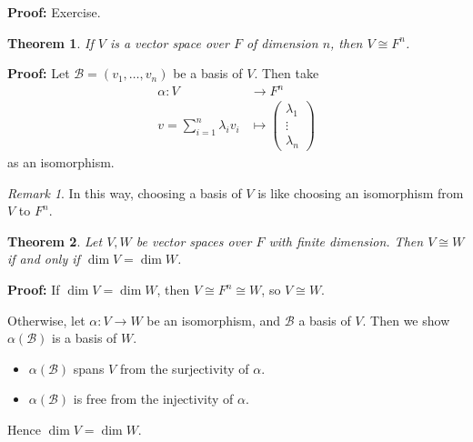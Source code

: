 \documentclass[12pt]{article}
\newtheorem{theorem}{Theorem}[section]
\theoremstyle{definition}
\theoremstyle{remark}
\newtheorem*{remark}{Remark}
\begin{document}
\begin{adjustbox}{minipage = \columnwidth - 25.5pt, margin=1em, frame=1pt, margin=0em}
\textbf{Proof:} Exercise.
\end{adjustbox}

\begin{theorem}
	If $V$ is a vector space over $F$ of dimension $n$, then $V \cong F^{n}$.
\end{theorem}

\begin{adjustbox}{minipage = \columnwidth - 25.5pt, margin=1em, frame=1pt, margin=0em}
	\textbf{Proof:} Let $\mathcal{B} = (v_1, \ldots, v_n)$ be a basis of $V$. Then take
	\begin{align*}
		\alpha : V &\to F^{n} \\
		v = \sum_{i = 1}^{n} \lambda_i v_i &\mapsto 
		\begin{pmatrix}
			\lambda_1 \\
			\vdots \\
			\lambda_n
		\end{pmatrix}
	\end{align*}
	as an isomorphism.
\end{adjustbox}

\begin{remark}
	In this way, choosing a basis of $V$ is like choosing an isomorphism from $V$ to $F^{n}$.
\end{remark}

\begin{theorem}
	Let $V, W$ be vector spaces over $F$ with finite dimension. Then $V \cong W$ if and only if $\dim V = \dim W$.
\end{theorem}

\begin{adjustbox}{minipage = \columnwidth - 25.5pt, margin=1em, frame=1pt, margin=0em}
\textbf{Proof:} If $\dim V = \dim W$, then $V \cong F^{n} \cong W$, so $V \cong W$.

Otherwise, let $\alpha : V \to W$ be an isomorphism, and $\mathcal{B}$ a basis of $V$. Then we show $\alpha(\mathcal{B})$ is a basis of $W$.
\begin{itemize}
	\item $\alpha(\mathcal{B})$ spans $V$ from the surjectivity of $\alpha$.
	\item $\alpha(\mathcal{B})$ is free from the injectivity of $\alpha$.
\end{itemize}
Hence $\dim V = \dim W$.

\end{adjustbox}
\end{document}
